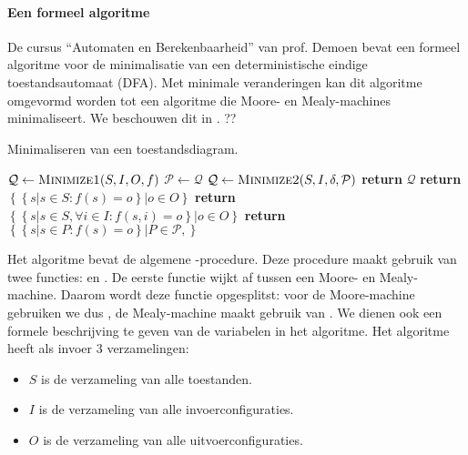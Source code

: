 \paragraph{Een formeel algoritme}
De cursus ``Automaten en Berekenbaarheid'' van prof. Demoen\cite{aenb10} bevat een formeel algoritme voor de minimalisatie van een deterministische eindige toestandsautomaat (DFA). Met minimale veranderingen kan dit algoritme omgevormd worden tot een algoritme die Moore- en Mealy-machines minimaliseert. We beschouwen dit in . ??%
\begin{algorithm}[hbt]
\caption{Minimaliseren van een toestandsdiagram.}\label{alg:minimizeFSM}
\begin{algorithmic}[1]
\State $\mathcal{Q}\gets\Call{Minimize1}{S,I,O,f}$
\Repeat
\State $\mathcal{P}\gets\mathcal{Q}$
\State $\mathcal{Q}\gets\Call{Minimize2}{S,I,\delta,\mathcal{P}}$
\State \textbf{return} $\mathcal{Q}$
\EndProcedure
{}
\State \textbf{return} $\left\{\left\{s|s\in S:f\left(s\right)=o\right\}|o\in O\right\}$
\EndFunction
{}
\State \textbf{return} $\left\{\left\{s|s\in S,\forall i\in I:f\left(s,i\right)=o\right\}|o\in O\right\}$
\EndFunction
{}
\State \textbf{return} $\left\{\left\{s|s\in P:f\left(s\right)=o\right\}|P\in\mathcal{P},\right\}$
\EndFunction
\end{algorithmic}
\end{algorithm}
Het algoritme bevat de algemene -procedure. Deze procedure maakt gebruik van twee functies:  en . De eerste functie wijkt af tussen een Moore- en Mealy-machine. Daarom wordt deze functie opgesplitst: voor de Moore-machine gebruiken we dus , de Mealy-machine maakt gebruik van . We dienen ook een formele beschrijving te geven van de variabelen in het algoritme. Het algoritme heeft als invoer 3 verzamelingen:
\begin{itemize}
 \item $S$ is de verzameling van alle toestanden.
 \item $I$ is de verzameling van alle invoerconfiguraties.
 \item $O$ is de verzameling van alle uitvoerconfiguraties.
\end{itemize}
